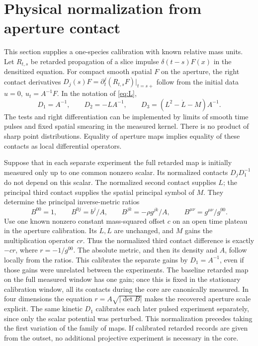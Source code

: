 \documentclass[11pt]{article}
\numberwithin{equation}{section}
\begin{document}
\section{Physical normalization from aperture contact}\label{sec:contact}

This section supplies a one-species calibration with known relative mass units. Let \(R_{t,s}\) be retarded propagation of a slice impulse \(\delta(t-s)F(x)\) in the densitized equation. For compact smooth spatial \(F\) on the aperture, the right contact derivatives \(D_j(s)F=\partial_t^j(R_{t,s}F)|_{t=s+}\) follow from the initial data \(u=0,\ u_t=A^{-1}F\). In the notation of \eqref{eq:L},
\begin{equation}\label{eq:jets}
 D_1=A^{-1},\qquad D_2=-L A^{-1},\qquad
 D_3=(L^2-\dot L-M)A^{-1}.
\end{equation}
The tests and right differentiation can be implemented by limits of smooth time pulses and fixed spatial smearing in the measured kernel. There is no product of sharp point distributions. Equality of aperture maps implies equality of these contacts as local differential operators.

Suppose that in each separate experiment the full retarded map is initially measured only up to one common nonzero scalar. Its normalized contacts \(D_jD_1^{-1}\) do not depend on this scalar. The normalized second contact supplies \(L\); the principal third contact supplies the spatial principal symbol of \(M\). They determine the principal inverse-metric ratios
\[
 B^{00}=1,\qquad B^{0j}=b^j/A,\qquad
 B^{jk}=-\rho g^{jk}/A,\qquad B^{\mu\nu}=g^{\mu\nu}/g^{00}.
\]
Use one known nonzero constant mass-squared offset \(c\) on an open time plateau in the aperture calibration. Its \(\dot L,L\) are unchanged, and \(M\) gains the multiplication operator \(c r\). Thus the normalized third contact difference is exactly \(-c r\), where \(r=-1/g^{00}\). The absolute metric, and then its density and \(A\), follow locally from the ratios. This calibrates the separate gains by \(D_1=A^{-1}\), even if those gains were unrelated between the experiments. The baseline retarded map on the full measured window has one gain; once this is fixed in the stationary calibration window, all its contacts during the core are canonically measured. In four dimensions the equation \(r=A\sqrt{|\det B|}\) makes the recovered aperture scale explicit. The same kinetic \(D_1\) calibrates each later pulsed experiment separately, since only the scalar potential was perturbed. This normalization precedes taking the first variation of the family of maps. If calibrated retarded records are given from the outset, no additional projective experiment is necessary in the core.
\end{document}
